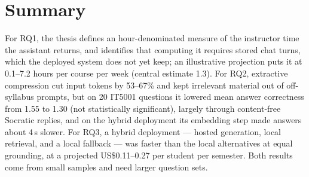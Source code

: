 \section{Summary}
\label{eval:sec:summary}

For RQ1, the thesis defines an hour-denominated measure of the instructor
time the assistant returns, and identifies that computing it requires
stored chat turns, which the deployed system does not yet keep; an
illustrative projection puts it at 0.1--7.2 hours per course per week
(central estimate 1.3). For RQ2, extractive
compression cut input tokens by 53--67\% and kept irrelevant material out of
off-syllabus prompts, but on 20 IT5001 questions it lowered mean answer
correctness from 1.55 to 1.30 (not statistically significant), largely
through content-free Socratic replies, and on the hybrid deployment its
embedding step made answers about 4\,s slower. For
RQ3, a hybrid deployment --- hosted generation, local retrieval, and a local
fallback --- was faster than the local alternatives at equal grounding, at a
projected US\$0.11--0.27 per student per semester. Both results come from
small samples and need larger question sets.
